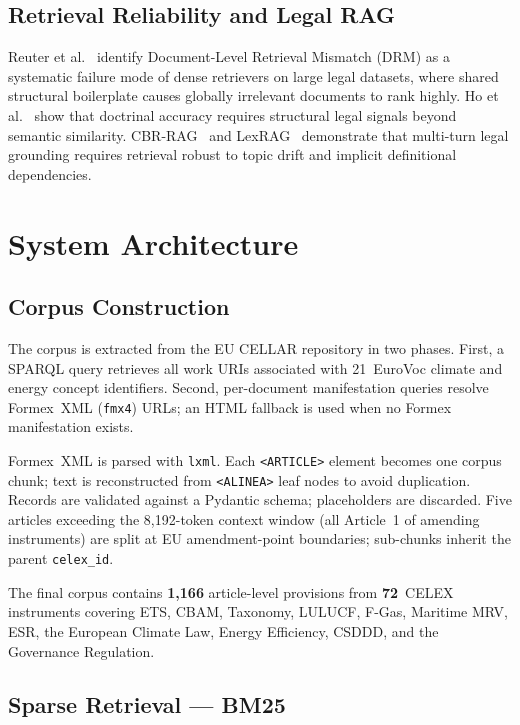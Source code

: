 \documentclass[conference]{IEEEtran}
\begin{document}
\subsection{Retrieval Reliability and Legal RAG}

Reuter et al.~\cite{12} identify Document-Level Retrieval Mismatch
(DRM) as a systematic failure mode of dense retrievers on large legal
datasets, where shared structural boilerplate causes globally
irrelevant documents to rank highly.
Ho et al.~\cite{13} show that doctrinal accuracy requires structural
legal signals beyond semantic similarity.
CBR-RAG~\cite{6} and LexRAG~\cite{7} demonstrate that multi-turn
legal grounding requires retrieval robust to topic drift and implicit
definitional dependencies.

\section{System Architecture}

\subsection{Corpus Construction}

The corpus is extracted from the EU CELLAR repository in two phases.
First, a SPARQL query retrieves all work URIs associated with
21~EuroVoc climate and energy concept identifiers.
Second, per-document manifestation queries resolve Formex~XML
(\texttt{fmx4}) URLs; an HTML fallback is used when no Formex
manifestation exists.

Formex~XML is parsed with \texttt{lxml}.
Each \texttt{<ARTICLE>} element becomes one corpus chunk; text is
reconstructed from \texttt{<ALINEA>} leaf nodes to avoid duplication.
Records are validated against a Pydantic schema; placeholders are
discarded.
Five articles exceeding the 8{,}192-token context window (all
Article~1 of amending instruments) are split at EU amendment-point
boundaries; sub-chunks inherit the parent \texttt{celex\_id}.

The final corpus contains \textbf{1{,}166} article-level provisions
from \textbf{72}~CELEX instruments covering ETS, CBAM, Taxonomy,
LULUCF, F-Gas, Maritime MRV, ESR, the European Climate Law, Energy
Efficiency, CSDDD, and the Governance Regulation.

\subsection{Sparse Retrieval --- BM25}
\end{document}
